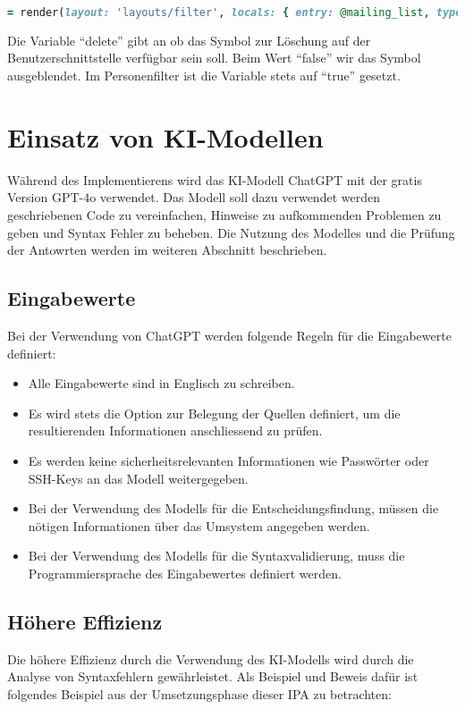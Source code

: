 \begin{lstlisting}[language=Ruby]
   = render(layout: 'layouts/filter', locals: { entry: @mailing_list, type: :attributes, delete: false}) do
\end{lstlisting}

Die Variable ``delete'' gibt an ob das Symbol zur Löschung auf der Benutzerschnittstelle verfügbar sein soll. Beim Wert ``false''
wir das Symbol ausgeblendet. Im Personenfilter ist die Variable stets auf ``true'' gesetzt.

\section{Einsatz von KI-Modellen}
Während des Implementierens wird das KI-Modell ChatGPT mit der gratis Version GPT-4o verwendet. 
Das Modell soll dazu verwendet werden geschriebenen Code zu vereinfachen, Hinweise zu aufkommenden Problemen zu geben und
Syntax Fehler zu beheben. Die Nutzung des Modelles und die Prüfung der Antowrten werden im weiteren Abschnitt beschrieben.

\subsection{Eingabewerte}
Bei der Verwendung von ChatGPT werden folgende Regeln für die Eingabewerte definiert:

\begin{itemize}
   \item Alle Eingabewerte sind in Englisch zu schreiben.
   \item Es wird stets die Option zur Belegung der Quellen definiert, um die resultierenden Informationen anschliessend zu prüfen.
   \item Es werden keine sicherheitsrelevanten Informationen wie Passwörter oder SSH-Keys an das Modell weitergegeben.
   \item Bei der Verwendung des Modells für die Entscheidungsfindung, müssen die nötigen Informationen über das Umsystem angegeben werden.
   \item Bei der Verwendung des Modells für die Syntaxvalidierung, muss die Programmiersprache des Eingabewertes definiert werden.
\end{itemize}

\subsection{Höhere Effizienz}
Die höhere Effizienz durch die Verwendung des KI-Modells wird durch die Analyse von Syntaxfehlern gewährleistet. 
Als Beispiel und Beweis dafür ist folgendes Beispiel aus der Umsetzungsphase dieser IPA zu betrachten:
\newline

